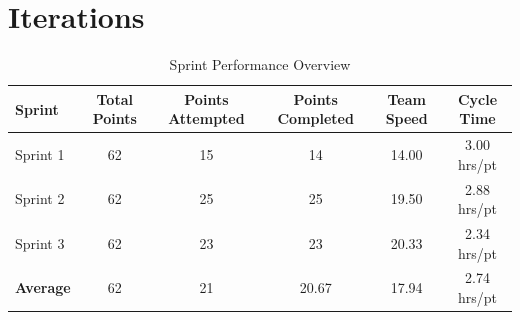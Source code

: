 \section{Iterations}



\begin{table}[h]
\centering
\caption{Sprint Performance Overview}
\label{tab:sprint-overview}
\begin{tabular}{|l|c|c|c|c|c|}
\hline
\textbf{Sprint} & \textbf{Total Points} & \textbf{Points Attempted} & \textbf{Points Completed} & \textbf{Team Speed} & \textbf{Cycle Time} \\
\hline
Sprint 1 & 62 & 15 & 14 & 14.00 & 3.00 hrs/pt \\
Sprint 2 & 62 & 25 & 25 & 19.50 & 2.88 hrs/pt \\
Sprint 3 & 62 & 23 & 23 & 20.33 & 2.34 hrs/pt \\
\hline
\textbf{Average} & 62 & 21 & 20.67 & 17.94 & 2.74 hrs/pt \\
\hline
\end{tabular}
\end{table}


